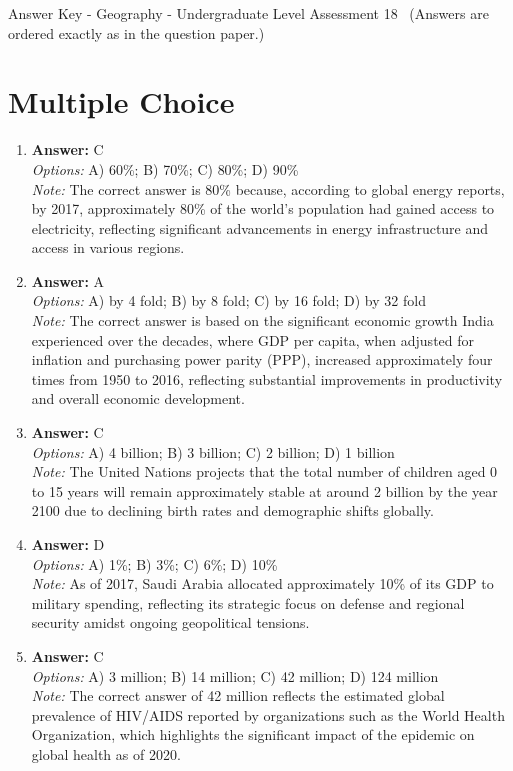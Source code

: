 \documentclass[12pt]{article}
\begin{document}
\begin{center}
Answer Key - Geography - Undergraduate Level Assessment 18 \
\small (Answers are ordered exactly as in the question paper.)
\end{center}

\section*{Multiple Choice}
\begin{enumerate}[label=\arabic*.]
\item \textbf{Answer:} C
\\ \textit{Options:} A) 60\%; B) 70\%; C) 80\%; D) 90\%
\\ \textit{Note:} The correct answer is 80\% because, according to global energy reports, by 2017, approximately 80\% of the world's population had gained access to electricity, reflecting significant advancements in energy infrastructure and access in various regions.
\item \textbf{Answer:} A
\\ \textit{Options:} A) by 4 fold; B) by 8 fold; C) by 16 fold; D) by 32 fold
\\ \textit{Note:} The correct answer is based on the significant economic growth India experienced over the decades, where GDP per capita, when adjusted for inflation and purchasing power parity (PPP), increased approximately four times from 1950 to 2016, reflecting substantial improvements in productivity and overall economic development.
\item \textbf{Answer:} C
\\ \textit{Options:} A) 4 billion; B) 3 billion; C) 2 billion; D) 1 billion
\\ \textit{Note:} The United Nations projects that the total number of children aged 0 to 15 years will remain approximately stable at around 2 billion by the year 2100 due to declining birth rates and demographic shifts globally.
\item \textbf{Answer:} D
\\ \textit{Options:} A) 1\%; B) 3\%; C) 6\%; D) 10\%
\\ \textit{Note:} As of 2017, Saudi Arabia allocated approximately 10\% of its GDP to military spending, reflecting its strategic focus on defense and regional security amidst ongoing geopolitical tensions.
\item \textbf{Answer:} C
\\ \textit{Options:} A) 3 million; B) 14 million; C) 42 million; D) 124 million
\\ \textit{Note:} The correct answer of 42 million reflects the estimated global prevalence of HIV/AIDS reported by organizations such as the World Health Organization, which highlights the significant impact of the epidemic on global health as of 2020.
\end{enumerate}
\end{document}
